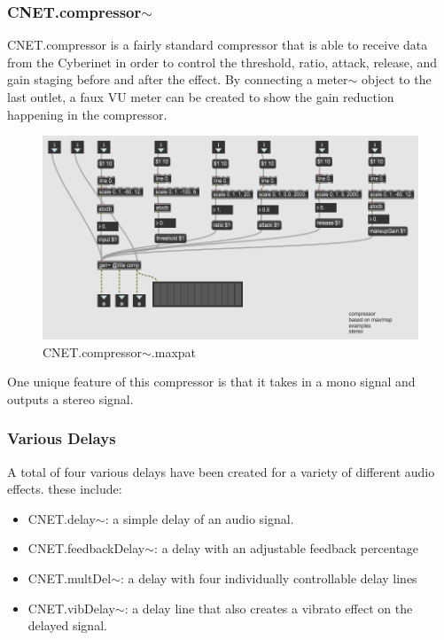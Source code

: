\subsubsection{CNET.compressor$\sim$}
CNET.compressor is a fairly standard compressor that is able to receive data from the Cyberinet in order to control the threshold, ratio, attack, release, and gain staging before and after the effect. By connecting a meter$\sim$ object to the last outlet, a faux VU meter can be created to show the gain reduction happening in the compressor.

\begin{figure}
    \centering
    \includegraphics{diagrams/maxPatches/CNET.compressor~.png}
    \caption{CNET.compressor$\sim$.maxpat}
    \label{fig:compmax}
\end{figure}

One unique feature of this compressor is that it takes in a mono signal and outputs a stereo signal.

\subsubsection{Various Delays}
A total of four various delays have been created for a variety of different audio effects. these include:

\begin{itemize}
    \item CNET.delay$\sim$: a simple delay of an audio signal.
    \item CNET.feedbackDelay$\sim$: a delay with an adjustable feedback percentage
    \item CNET.multDel$\sim$: a delay with four individually controllable delay lines
    \item CNET.vibDelay$\sim$: a delay line that also creates a vibrato effect on the delayed signal.
\end{itemize}

